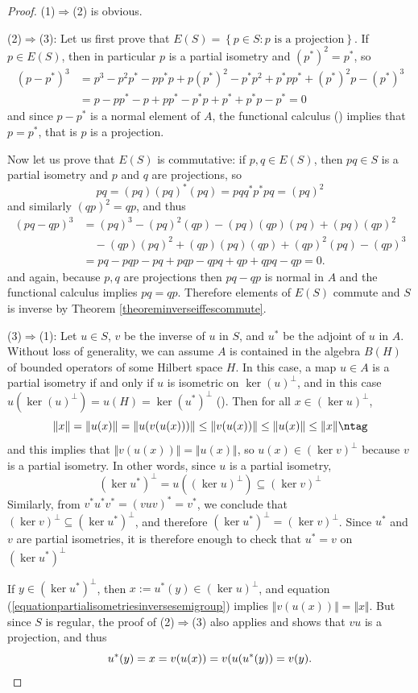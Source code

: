 \begin{proof}
(1)$\Rightarrow$(2) is obvious.

(2)$\Rightarrow$(3): Let us first prove that $E(S)=\left\{p\in S:p\text{ is a projection}\right\}$. If $p\in E(S)$, then in particular $p$ is a partial isometry and $(p^*)^2=p^*$, so
\begin{align*}
(p-p^*)^3&=p^3-p^2p^*-pp^*p+p(p^*)^2-p^*p^2+p^*pp^*+(p^*)^2p-(p^*)^3\\
&=p-pp^*-p+pp^*-p^*p+p^*+p^*p-p^*=0
\end{align*}
and since $p-p^*$ is a normal element of $A$, the functional calculus (\cite[Theorem 2.1.3]{MR1074574}) implies that $p=p^*$, that is $p$ is a projection.

Now let us prove that $E(S)$ is commutative: if $p,q\in E(S)$, then $pq\in S$ is a partial isometry and $p$ and $q$ are projections, so
\[pq=(pq)(pq)^*(pq)=pqq^*p^*pq=(pq)^2\]
and similarly $(qp)^2=qp$, and thus
\begin{align*}
(pq-qp)^3&=(pq)^3-(pq)^2(qp)-(pq)(qp)(pq)+(pq)(qp)^2\\
&\quad-(qp)(pq)^2+(qp)(pq)(qp)+(qp)^2(pq)-(qp)^3\\
&=pq-pqp-pq+pqp-qpq+qp+qpq-qp=0.
\end{align*}
and again, because $p,q$ are projections then $pq-qp$ is normal in $A$ and the functional calculus implies $pq=qp$. Therefore elements of $E(S)$ commute and $S$ is inverse by Theorem \ref{theoreminverseiffescommute}.

(3)$\Rightarrow$(1): Let $u\in S$, $v$ be the inverse of $u$ in $S$, and $u^*$ be the adjoint of $u$ in $A$. Without loss of generality, we can assume $A$ is contained in the algebra $B(H)$ of bounded operators of some Hilbert space $H$. In this case, a map $u\in A$ is a partial isometry if and only if $u$ is isometric on $\ker(u)^\perp$, and in this case $u(\ker(u)^\perp)=u(H)=\ker(u^*)^\perp$ (\cite[Theorem 2.3.3]{MR1074574}). Then for all $x\in(\ker u)^\perp$,
\[\Vert x\Vert=\Vert u(x)\Vert=\Vert u(v(u(x)))\Vert\leq\Vert v(u(x))\Vert\leq\Vert u(x)\Vert\leq\Vert x\Vert\ntag\label{equationpartialisometriesinversesemigroup}\]
and this implies that $\Vert v(u(x))\Vert=\Vert u(x)\Vert$, so $u(x)\in(\ker v)^\perp$ because $v$ is a partial isometry. In other words, since $u$ is a partial isometry,
\[\left(\ker u^*\right)^\perp=u\left((\ker u)^\perp\right)\subseteq\left(\ker v\right)^\perp\]
Similarly, from $v^*u^*v^*=(vuv)^*=v^*$, we conclude that $\left(\ker v\right)^\perp\subseteq\left(\ker u^*\right)^\perp$, and therefore $\left(\ker u^*\right)^\perp=\left(\ker v\right)^\perp$. Since $u^*$ and $v$ are partial isometries, it is therefore enough to check that $u^*=v$ on $\left(\ker u^*\right)^\perp$

If $y\in\left(\ker u^*\right)^\perp$, then $x:=u^*(y)\in(\ker u)^\perp$, and equation (\ref{equationpartialisometriesinversesemigroup}) implies $\Vert v(u(x))\Vert=\Vert x\Vert$. But since $S$ is regular, the proof of (2)$\Rightarrow$(3) also applies and shows that $vu$ is a projection, and thus
\[u^*(y)=x=v(u(x))=v(u(u^*(y))=v(y).\qedhere\]
\end{proof}
